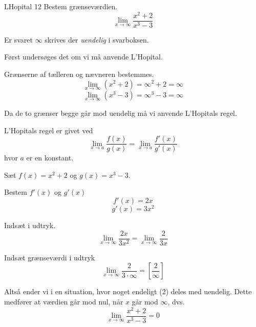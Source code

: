 \documentclass{article}
\begin{document}
\begin{exercise}{LHopital 12}
Bestem grænseværdien.
\[
\lim_{x \to \infty} \frac{x^2 + 2}{x^3 - 3}
\] 

Er svaret $\infty$ skrives der \emph{uendelig} i svarboksen.


\hint
Først undersøges det om vi må anvende L'Hopital.

\hint
Grænserne af tælleren og nævneren bestemmes.
\[
	\lim_{x \to \infty} (x^2 + 2) = \infty ^2 + 2 = \infty 
\]
\[
	\lim_{x \to \infty} (x^3 - 3) = \infty ^3 - 3 = \infty
\]

\hint
Da de to grænser begge går mod uendelig må vi  anvende L'Hopitals regel. 

\hint
L'Hopitals regel er givet ved
\[
\lim_{x \to a} \frac{f(x)}{g(x)} = \lim_{x \to a} \frac{f'(x)}{g'(x)} 
\]
hvor $a$  er en konstant.

\hint
Sæt $f(x) = x^2 + 2$ og $g(x) = x^3 - 3$. 

\hint
Bestem $f'(x)$ og $g'(x)$
\[
f'(x) = 2x
\]
\[
g'(x) = 3x^2
\]

\hint
Indsæt i udtryk.
\[
\lim_{x \to \infty} \frac{2x}{3x^2} = \lim_{x \to \infty} \frac{2}{3x} 
\]

\hint
Indsæt grænseværdi i udtryk
\[
\lim_{x \to \infty} \frac{2}{3 \cdot \infty}  = \left[ \frac{2}{\infty}  \right] 
\]

\hint
Altså ender vi i en situation, hvor noget endeligt (2) deles med uendelig. Dette medfører at værdien går mod nul, når $x$ går mod $\infty$, dvs.
\[
\lim_{x \to \infty} \frac{x^2 + 2}{x^3 - 3} = 0
\]

\end{exercise}
\end{document}
